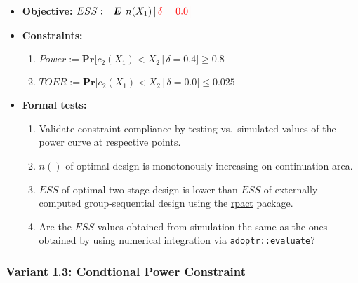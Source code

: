 \documentclass[]{book}
\providecommand{\tightlist}{%
  \setlength{\itemsep}{0pt}\setlength{\parskip}{0pt}}
\begin{document}
\begin{itemize}
\tightlist
\item
  \textbf{Objective:} \(ESS := \boldsymbol{E}\big[n(X_1)\,|\,\color{red}{\delta=0.0}\big]\)
\item
  \textbf{Constraints:}

  \begin{enumerate}
  \def\labelenumi{\arabic{enumi}.}
  \tightlist
  \item
    \(Power := \boldsymbol{Pr}\big[c_2(X_1) < X_2\,|\,\delta=0.4\big] \geq 0.8\)
  \item
    \(TOER := \boldsymbol{Pr}\big[c_2(X_1) < X_2\,|\,\delta=0.0\big] \leq 0.025\)
  \end{enumerate}
\item
  \textbf{Formal tests:}

  \begin{enumerate}
  \def\labelenumi{\arabic{enumi}.}
  \tightlist
  \item
    Validate constraint compliance by testing vs.~simulated
    values of the power curve at respective points.
  \item
    \(n()\) of optimal design is monotonously increasing on continuation area.
  \item
    \(ESS\) of optimal two-stage design is lower than \(ESS\) of externally
    computed group-sequential design using the \href{https://rpact.org/}{rpact} package.
  \item
    Are the \(ESS\) values obtained from simulation the same as the ones
    obtained by using numerical integration via \texttt{adoptr::evaluate}?
  \end{enumerate}
\end{itemize}

\hypertarget{variant-i.3-condtional-power-constraint}{%
\subsubsection{\texorpdfstring{\protect\hyperlink{variantI_3}{Variant I.3: Condtional Power Constraint}}{Variant I.3: Condtional Power Constraint}}\label{variant-i.3-condtional-power-constraint}}
\end{document}
